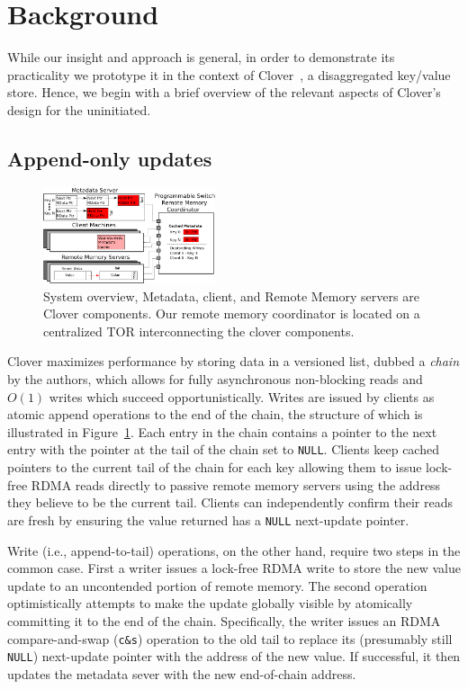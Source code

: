 \section{Background}

While our insight and approach is general, in order to demonstrate its
practicality we prototype it in the context of Clover~\cite{clover}, a
disaggregated key/value store.  Hence, we begin with a brief overview
of the relevant aspects of Clover's design for the uninitiated.

\subsection{Append-only updates}

\begin{figure}
    \includegraphics[width=0.45\textwidth]{fig/overview_2.png}
    \caption{ System overview, Metadata, client, and Remote Memory
    servers are Clover components. Our remote memory coordinator is
    located on a centralized TOR interconnecting the clover components.
    }
    \label{fig:overview} 
\end{figure}

Clover maximizes performance by storing data in a versioned list, dubbed a
\emph{chain} by the authors, which allows for fully asynchronous non-blocking
reads and $O(1)$ writes which succeed opportunistically. Writes are issued by
clients as atomic append operations to the end of the chain, the structure of
which is illustrated in Figure~\ref{fig:overview}. Each entry in the chain
contains a pointer to the next entry with the pointer at the tail of the
chain set to \texttt{NULL}. Clients keep cached pointers to the current tail of the
chain for each key allowing them to issue lock-free RDMA reads directly to
passive remote memory servers using the address they believe to be the
current tail. Clients can independently confirm their reads are
fresh by ensuring the value returned has a \texttt{NULL} next-update pointer.

Write (i.e., append-to-tail) operations, on the other hand, require two steps
in the common case. First a writer issues a lock-free RDMA write to store the
new value update to an uncontended portion of remote memory. The
second operation optimistically attempts to make the update globally visible
by atomically committing it to the end of the chain. Specifically, the writer
issues an RDMA compare-and-swap (\texttt{c\&s}) operation to the old tail to replace
its (presumably still \texttt{NULL}) next-update pointer with the address of the
new value. If successful, it then updates the metadata sever with
the new end-of-chain address.

